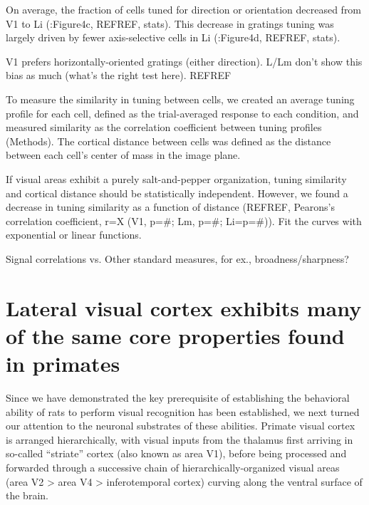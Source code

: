 On average, the fraction of cells tuned for direction or orientation decreased from V1 to Li ({\fig:Figure4c}, REFREF, stats). This decrease in gratings tuning was largely driven by fewer axis-selective cells in Li ({\fig:Figure4d}, REFREF, stats). 

V1 prefers horizontally-oriented gratings (either direction). L/Lm don’t show this bias as much (what’s the right test here). REFREF


To measure the similarity in tuning between cells, we created an average tuning profile for each cell, defined as the trial-averaged response to each condition, and measured similarity as the correlation coefficient between tuning profiles (Methods). The cortical distance between cells was defined as the distance between each cell’s center of mass in the image plane. 

If visual areas exhibit a purely salt-and-pepper organization, tuning similarity and cortical distance should be statistically independent. However, we found a decrease in tuning similarity as a function of distance (REFREF, Pearons’s correlation coefficient, r=X (V1, p=#; Lm, p=#; Li=p=#)). Fit the curves with exponential or linear functions. 

Signal correlations vs. %
Other standard measures, for ex., broadness/sharpness?







\section{Lateral visual cortex exhibits many of the same core properties found in primates}

Since we have demonstrated the key prerequisite of establishing the behavioral ability of rats to perform visual recognition has been established, we next turned our attention to the neuronal substrates of these abilities.  Primate visual cortex is arranged hierarchically, with visual inputs from the thalamus first arriving in so-called ``striate'' cortex (also known as area V1), before being processed and forwarded through a successive chain of hierarchically-organized visual areas (area V2 > area V4 > inferotemporal cortex) curving along the ventral surface of the brain.  

